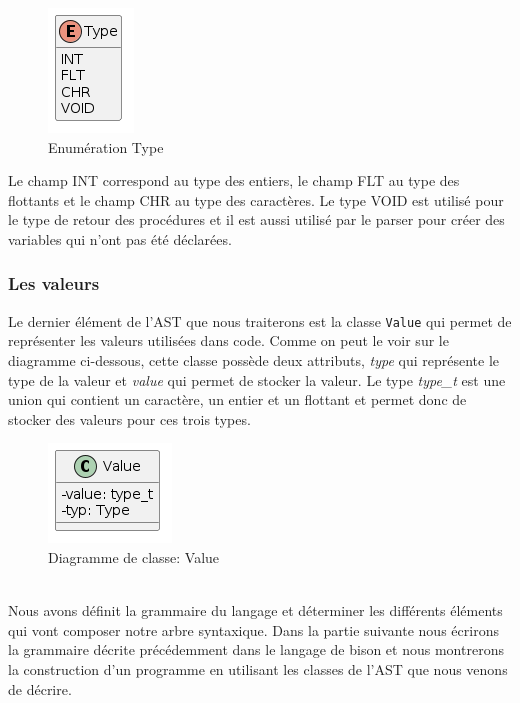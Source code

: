 \documentclass[a4paper]{article}%
\begin{document}
\begin{figure}[h!]
  \begin{center}
  \includegraphics[scale=0.5]{../ressources/diagrams/Type.png}
  \caption{Enumération Type}
  \end{center}
\end{figure}

Le champ INT correspond au type des entiers, le champ FLT au type des flottants
et le champ CHR au type des caractères. Le type VOID est utilisé pour le type de
retour des procédures et il est aussi utilisé par le \gls{parser} pour créer des
variables qui n'ont pas été déclarées.

\subsubsection*{Les valeurs}

Le dernier élément de l'AST que nous traiterons est la classe \lstinline{Value}
qui permet de représenter les valeurs utilisées dans code. Comme on peut le voir
sur le diagramme ci-dessous, cette classe possède deux attributs, \textit{type}
qui représente le type de la valeur et \textit{value} qui permet de stocker la
valeur. Le type \textit{type\_t} est une union qui contient un caractère, un
entier et un flottant et permet donc de stocker des valeurs pour ces trois
types.

\begin{figure}[h!]
  \begin{center}
  \includegraphics[scale=0.5]{../ressources/diagrams/value.png}
  \caption{Diagramme de classe: Value}
  \end{center}
\end{figure}
~\\

Nous avons définit la grammaire du langage et déterminer les différents éléments
qui vont composer notre arbre syntaxique. Dans la partie suivante nous écrirons
la grammaire décrite précédemment dans le langage de bison et nous montrerons
la construction d'un programme en utilisant les classes de l'AST que nous
venons de décrire.
\end{document}
